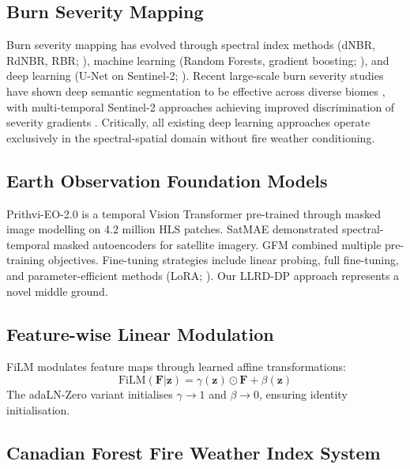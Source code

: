 \documentclass[review,12pt]{elsarticle}
\begin{document}
\subsection{Burn Severity Mapping}

Burn severity mapping has evolved through spectral index methods (dNBR, RdNBR, RBR; \citealt{key2006,miller2007,parks2014}), machine learning (Random Forests, gradient boosting; \citealt{collins2018,hislop2019}), and deep learning (U-Net on Sentinel-2; \citealt{knopp2020,hu2021,seydi2022}). Recent large-scale burn severity studies have shown deep semantic segmentation to be effective across diverse biomes \citep{hu2023isprs}, with multi-temporal Sentinel-2 approaches achieving improved discrimination of severity gradients \citep{han2024jstars}. Critically, all existing deep learning approaches operate exclusively in the spectral-spatial domain without fire weather conditioning.

\subsection{Earth Observation Foundation Models}

Prithvi-EO-2.0 \citep{jakubik2024} is a temporal Vision Transformer pre-trained through masked image modelling on 4.2 million HLS patches. SatMAE \citep{cong2022} demonstrated spectral-temporal masked autoencoders for satellite imagery. GFM \citep{mendieta2023} combined multiple pre-training objectives. Fine-tuning strategies include linear probing, full fine-tuning, and parameter-efficient methods (LoRA; \citealt{hu2022lora}). Our LLRD-DP approach represents a novel middle ground.

\subsection{Feature-wise Linear Modulation}

FiLM \citep{perez2018} modulates feature maps through learned affine transformations:
\begin{equation}
  \text{FiLM}(\mathbf{F} | \mathbf{z}) = \gamma(\mathbf{z}) \odot \mathbf{F} + \beta(\mathbf{z})
\end{equation}
The adaLN-Zero variant \citep{peebles2023} initialises $\gamma \to 1$ and $\beta \to 0$, ensuring identity initialisation.

\subsection{Canadian Forest Fire Weather Index System}
\end{document}

